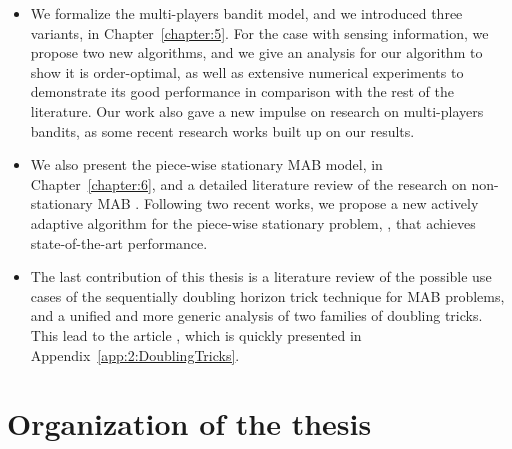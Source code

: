 \begin{itemize}
    \item
    We formalize the multi-players bandit model, and we introduced three variants, in Chapter~\ref{chapter:5}.
    For the case with sensing information, we propose two new algorithms, and we give an analysis for our algorithm \MCTopM{} to show it is order-optimal,
    as well as extensive numerical experiments to demonstrate its good performance in comparison with the rest of the literature.
    Our work \cite{Besson2018ALT} also gave a new impulse on research on multi-players bandits, as some recent research works built up on our results.


    \item
    We also present the piece-wise stationary MAB model, in Chapter~\ref{chapter:6}, and a detailed literature review of the research on non-stationary MAB \cite{Besson2019GLRT,Besson2019Gretsi}.
    Following two recent works, we propose a new actively adaptive algorithm for the piece-wise stationary problem, \GLRklUCB, that achieves state-of-the-art performance.

    \item
    The last contribution of this thesis is a literature review of the possible use cases of the sequentially doubling horizon trick technique for MAB problems,
    and a unified and more generic analysis of two families of doubling tricks.
    This lead to the article \cite{Besson2018DoublingTricks}, which is quickly presented in Appendix~\ref{app:2:DoublingTricks}.
\end{itemize}



\section{Organization of the thesis}
\label{sec:1:organization}


